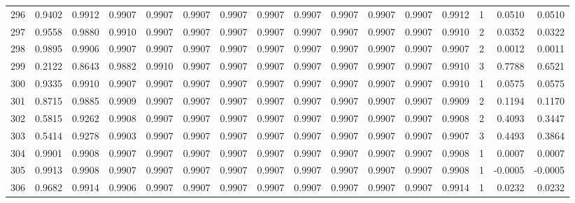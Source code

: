 \begin{tabular}{lrrrrrrrrrrrrrrr}
296 &      0.9402 &  0.9912 &  0.9907 &  0.9907 &  0.9907 &  0.9907 &  0.9907 &  0.9907 &  0.9907 &  0.9907 &   0.9907 &     0.9912 &      1 &                    0.0510 &                     0.0510 \\
297 &      0.9558 &  0.9880 &  0.9910 &  0.9907 &  0.9907 &  0.9907 &  0.9907 &  0.9907 &  0.9907 &  0.9907 &   0.9907 &     0.9910 &      2 &                    0.0352 &                     0.0322 \\
298 &      0.9895 &  0.9906 &  0.9907 &  0.9907 &  0.9907 &  0.9907 &  0.9907 &  0.9907 &  0.9907 &  0.9907 &   0.9907 &     0.9907 &      2 &                    0.0012 &                     0.0011 \\
299 &      0.2122 &  0.8643 &  0.9882 &  0.9910 &  0.9907 &  0.9907 &  0.9907 &  0.9907 &  0.9907 &  0.9907 &   0.9907 &     0.9910 &      3 &                    0.7788 &                     0.6521 \\
300 &      0.9335 &  0.9910 &  0.9907 &  0.9907 &  0.9907 &  0.9907 &  0.9907 &  0.9907 &  0.9907 &  0.9907 &   0.9907 &     0.9910 &      1 &                    0.0575 &                     0.0575 \\
301 &      0.8715 &  0.9885 &  0.9909 &  0.9907 &  0.9907 &  0.9907 &  0.9907 &  0.9907 &  0.9907 &  0.9907 &   0.9907 &     0.9909 &      2 &                    0.1194 &                     0.1170 \\
302 &      0.5815 &  0.9262 &  0.9908 &  0.9907 &  0.9907 &  0.9907 &  0.9907 &  0.9907 &  0.9907 &  0.9907 &   0.9907 &     0.9908 &      2 &                    0.4093 &                     0.3447 \\
303 &      0.5414 &  0.9278 &  0.9903 &  0.9907 &  0.9907 &  0.9907 &  0.9907 &  0.9907 &  0.9907 &  0.9907 &   0.9907 &     0.9907 &      3 &                    0.4493 &                     0.3864 \\
304 &      0.9901 &  0.9908 &  0.9907 &  0.9907 &  0.9907 &  0.9907 &  0.9907 &  0.9907 &  0.9907 &  0.9907 &   0.9907 &     0.9908 &      1 &                    0.0007 &                     0.0007 \\
305 &      0.9913 &  0.9908 &  0.9907 &  0.9907 &  0.9907 &  0.9907 &  0.9907 &  0.9907 &  0.9907 &  0.9907 &   0.9907 &     0.9908 &      1 &                   -0.0005 &                    -0.0005 \\
306 &      0.9682 &  0.9914 &  0.9906 &  0.9907 &  0.9907 &  0.9907 &  0.9907 &  0.9907 &  0.9907 &  0.9907 &   0.9907 &     0.9914 &      1 &                    0.0232 &                     0.0232 \\

\end{tabular}
